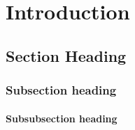 

\chapter{Introduction}

\section{Section Heading}

\subsection{Subsection heading}

\subsubsection{Subsubsection heading}

